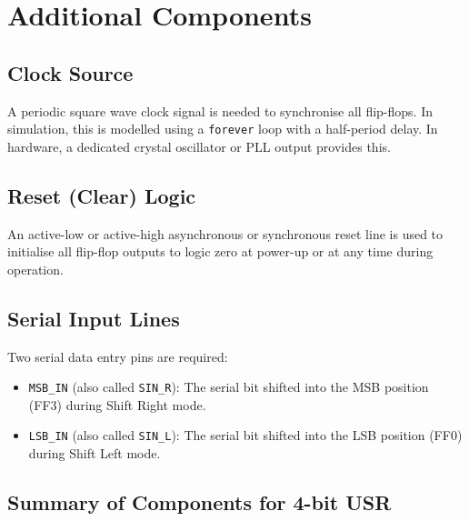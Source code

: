 \documentclass[12pt,a4paper]{report}
\newcommand{\signal}[1]{\texttt{\textcolor{codeblue}{#1}}}
\begin{document}
\section{Additional Components}

\subsection{Clock Source}

A periodic square wave clock signal is needed to synchronise all flip-flops. In simulation, this is modelled using a \texttt{forever} loop with a half-period delay. In hardware, a dedicated crystal oscillator or PLL output provides this.

\subsection{Reset (Clear) Logic}

An active-low or active-high asynchronous or synchronous reset line is used to initialise all flip-flop outputs to logic zero at power-up or at any time during operation.

\subsection{Serial Input Lines}

Two serial data entry pins are required:
\begin{itemize}
    \item \signal{MSB\_IN} (also called \signal{SIN\_R}): The serial bit shifted into the MSB position (FF3) during Shift Right mode.
    \item \signal{LSB\_IN} (also called \signal{SIN\_L}): The serial bit shifted into the LSB position (FF0) during Shift Left mode.
\end{itemize}

\subsection{Summary of Components for 4-bit USR}
\end{document}
